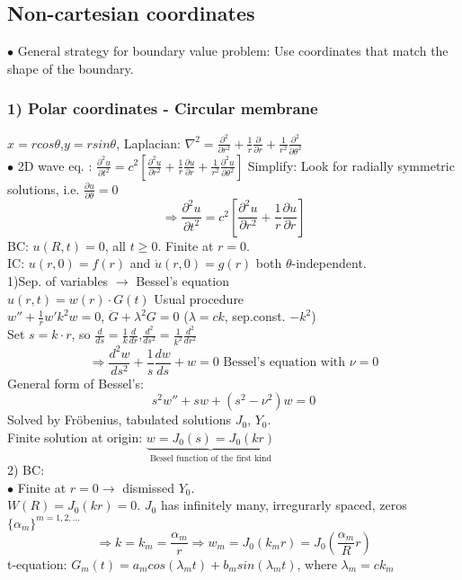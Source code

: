 \documentclass[10pt,a4paper]{article}
\begin{document}
\begin{multicols}{2}
\subsection*{Non-cartesian coordinates}
$\bullet$ General strategy for boundary value problem: Use coordinates that match the shape of the boundary.

\subsubsection*{1) Polar coordinates - Circular membrane}
$x=rcos\theta$,$y=rsin\theta$, Laplacian: \(\nabla^{2}=\frac{\partial^{2}}{\partial r^{2}}+\frac{1}{r}\frac{\partial}{\partial r}+\frac{1}{r^{2}}\frac{\partial^{2}}{\partial \theta^{2}}\) \\
$\bullet$ 2D wave eq. : \(\frac{\partial^{2}u}{\partial t^{2}} = c^{2}\left[\frac{\partial^{2}u}{\partial r^{2}}+\frac{1}{r}\frac{\partial u}{\partial r}+\frac{1}{r^{2}}\frac{\partial^{2}u}{\partial \theta^{2}}\right] \)
Simplify: Look for radially symmetric solutions, i.e. $\frac{\partial u}{\partial \theta} = 0$ 
\[\Rightarrow \frac{\partial^{2}u}{\partial t^{2}} = c^{2}\left[\frac{\partial^{2}u}{\partial r^{2}}+\frac{1}{r}\frac{\partial u}{\partial r}\right]\]
BC: $u(R,t)=0$, all $t\geq 0$. Finite at $r=0$. \\
IC: $u(r,0)=f(r)$ and $\dot u(r,0)=g(r)$ both $\theta$-independent.\\
\vspace{2mm}
1)Sep. of variables $\rightarrow$ Bessel's equation \\
$u(r,t)=w(r)\cdot G(t)$ Usual procedure \\
\(w'' + \frac{1}{r}w' k^{2}w=0\), \(\ddot G + \lambda^{2}G=0\) ($\lambda=ck$, sep.const. $-k^{2}$) \\
Set $s=k\cdot r$, so $\frac{d}{ds}=\frac{1}{k}\frac{d}{dr}$,$\frac{d^{2}}{ds^{2}}=\frac{1}{k^{2}}\frac{d^{2}}{dr^{2}}$
\[\Rightarrow \frac{d^{2}w}{ds^{2}}+\frac{1}{s}\frac{dw}{ds}+w=0 \text{ Bessel's equation with $\nu =0$} \]
General form of Bessel's:
\[s^{2}w''+sw+(s^{2}-\nu^{2})w=0\]
Solved by Fr\"obenius, tabulated solutions $J_{0}$, $Y_{0}$. \\
Finite solution at origin: $\underbrace{w=J_{0}(s)=J_{0}(kr)}_{\text{Bessel function of the first kind}}$ \\
2) BC: \\
$\bullet$ Finite at $r=0 \rightarrow$ dismissed $Y_{0}$. \\
$W(R) = J_{0}(kr)=0$. $J_{0}$ has infinitely many, irregurarly spaced, zeros $\{ \alpha_{m}\}^{m=1,2,...}$
\[\Rightarrow k=k_{m} = \frac{\alpha_{m}}{r}\Rightarrow w_{m}=J_{0}(k_{m}r)=J_{0}(\frac{\alpha_{m}}{R}r)\]
t-equation: \(G_{m}(t) = a_{m}cos(\lambda_{m}t)+b_{m}sin(\lambda_{m}t)\), where $\lambda_{m}=ck_{m}$


\end{multicols}
\end{document}
